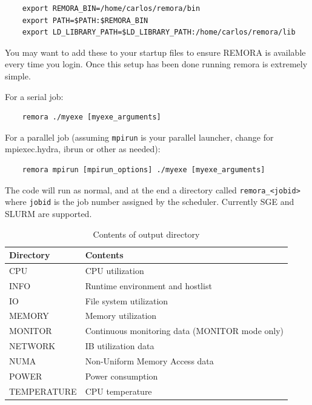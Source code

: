 \documentclass[10pt,a4paper]{report}
\begin{document}
\begin{verbatim}
	export REMORA_BIN=/home/carlos/remora/bin
	export PATH=$PATH:$REMORA_BIN
	export LD_LIBRARY_PATH=$LD_LIBRARY_PATH:/home/carlos/remora/lib
\end{verbatim}

You may want to add these to your startup files to ensure REMORA is available every time you login. Once this setup has been done running remora is extremely simple.

For a serial job:

\begin{verbatim}
	remora ./myexe [myexe_arguments]
\end{verbatim} 

For a parallel job (assuming \verb+mpirun+ is your parallel launcher, change for mpiexec.hydra, ibrun or other as needed):

\begin{verbatim}
	remora mpirun [mpirun_options] ./myexe [myexe_arguments]
\end{verbatim} 

The code will run as normal, and at the end a directory called \verb+remora_<jobid>+ where \verb+jobid+ is the job number assigned by the scheduler. Currently SGE and SLURM are supported.

\begin{table}
\begin{center}
\begin{tabular}{|l|l|}
\hline
\bf{Directory} & \bf{Contents}\\\hline
CPU	      & CPU utilization\\\hline
INFO      & Runtime environment and hostlist\\\hline
IO        & File system utilization\\\hline 
MEMORY    & Memory utilization\\\hline
MONITOR   & Continuous monitoring data (MONITOR mode only)\\\hline
NETWORK   & IB utilization data\\\hline
NUMA      & Non-Uniform Memory Access data\\\hline
POWER     & Power consumption\\\hline
TEMPERATURE & CPU temperature\\
\hline
\end{tabular}
\label{tab:outdir}
\caption{Contents of output directory}
\end{center}
\end{table}
\end{document}
